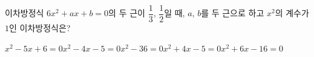 이차방정식 $6x^2+ax+b=0$의 두 근이 $\dfrac{1}{3}$, $\dfrac{1}{2}$일 때, $a$, $b$를 두 근으로 하고 $x^2$의 계수가 $1$인 이차방정식은? 
\begin{choicesii}{$x^2-5x+6=0$}{$x^2-4x-5=0$}{$x^2-36=0$}{$x^2+4x-5=0$}{$x^2+6x-16=0$}\end{choicesii}
